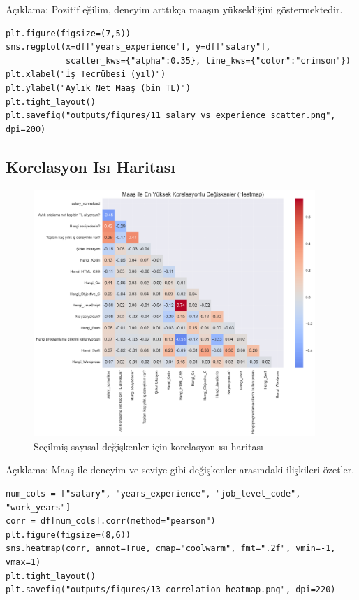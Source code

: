 \documentclass[12pt,a4paper]{article}
\begin{document}
\noindent Açıklama: Pozitif eğilim, deneyim arttıkça maaşın yükseldiğini göstermektedir.

\begin{lstlisting}[style=python, caption={Saçılım grafiği üretim kodu}]
plt.figure(figsize=(7,5))
sns.regplot(x=df["years_experience"], y=df["salary"],
            scatter_kws={"alpha":0.35}, line_kws={"color":"crimson"})
plt.xlabel("İş Tecrübesi (yıl)")
plt.ylabel("Aylık Net Maaş (bin TL)")
plt.tight_layout()
plt.savefig("outputs/figures/11_salary_vs_experience_scatter.png", dpi=200)
\end{lstlisting}

\subsection{Korelasyon Isı Haritası}
\begin{figure}[H]
    \centering
    \includegraphics[width=0.95\textwidth]{13_correlation_heatmap.png}
    \caption{Seçilmiş sayısal değişkenler için korelasyon ısı haritası}
\end{figure}

\noindent Açıklama: Maaş ile deneyim ve seviye gibi değişkenler arasındaki ilişkileri özetler.

\begin{lstlisting}[style=python, caption={Korelasyon ısı haritası üretim kodu}]
num_cols = ["salary", "years_experience", "job_level_code", "work_years"]
corr = df[num_cols].corr(method="pearson")
plt.figure(figsize=(8,6))
sns.heatmap(corr, annot=True, cmap="coolwarm", fmt=".2f", vmin=-1, vmax=1)
plt.tight_layout()
plt.savefig("outputs/figures/13_correlation_heatmap.png", dpi=220)
\end{lstlisting}
\end{document}
